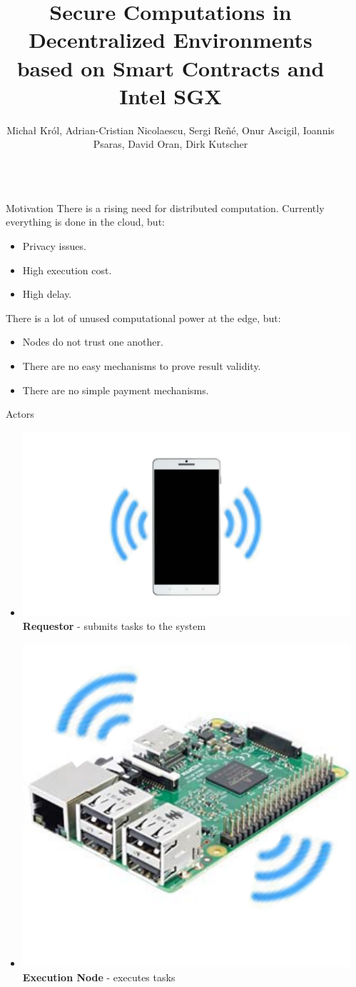 \documentclass[final]{beamer}
\title{Secure Computations in Decentralized Environments \\based on Smart Contracts and Intel SGX} %
\author{Michał Król, Adrian-Cristian Nicolaescu, Sergi Reñé, Onur Ascigil, Ioannis Psaras, David Oran, Dirk Kutscher} %
\institute{University College London, Network Systems Research \& Design, Huawei} %
\newlength{\sepwid}
\newlength{\onecolwid}
\begin{document}

\setlength{\belowcaptionskip}{2ex} %
\setlength\belowdisplayshortskip{2ex} %

\begin{frame}[t] %

\begin{columns}[t] %

\begin{column}{\sepwid}\end{column} %

\begin{column}{\onecolwid} %


\begin{alertblock}{Motivation}
There is a rising need for distributed computation. Currently everything is done in the cloud, but:
\begin{itemize}
\item Privacy issues.
\item High execution cost.
\item High delay.
\end{itemize}
There is a lot of unused computational power at the edge, but:
\begin{itemize}
 \item Nodes do not trust one another.
 \item There are no easy mechanisms to prove result validity.
 \item There are no simple payment mechanisms. 
\end{itemize}


\end{alertblock}

\begin{block}{Actors}
 \begin{itemize}
  \item[] \includegraphics[width=0.09\linewidth]{img/user} \textbf{Requestor} - submits tasks to the system
  \item[] \includegraphics[width=0.07\linewidth]{img/pi} \textbf{Execution Node} - executes tasks
 \end{itemize}


\end{block}
\end{column}
\end{columns}
\end{frame}
\end{document}
